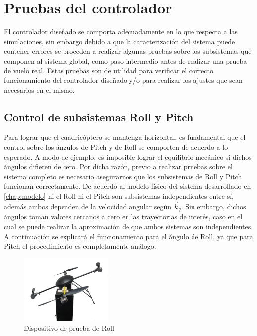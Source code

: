 \documentclass[main]{subfiles}
\begin{document}
\chapter{Pruebas del controlador}
El controlador diseñado se comporta adecuadamente en lo que respecta a las simulaciones, sin embargo debido a que la caracterizaci\'on del sistema puede contener errores se proceden a realizar algunas pruebas sobre los subsistemas que componen al sistema global, como paso intermedio antes de realizar una prueba de vuelo real. Estas pruebas son de utilidad para verificar el correcto funcionamiento del controlador diseñado y/o para realizar los ajustes que sean necesarios en el mismo.

\section{Control de subsistemas Roll y Pitch}

Para lograr que el cuadric\'optero se mantenga horizontal, es fundamental que el control sobre los \'angulos de Pitch y de Roll se comporten de acuerdo a lo esperado. A modo de ejemplo, es imposible lograr el equilibrio mec\'anico si dichos \'angulos difieren de cero. Por dicha raz\'on, previo a realizar pruebas sobre el sistema completo es necesario asegurarnos que los subsistemas de  Roll y Pitch funcionan correctamente. De acuerdo al modelo f\'isico del sistema desarrollado en \ref{chap:modelo} ni el Roll ni el Pitch son subsistemas independientes entre s\'i, adem\'as ambos dependen de la velocidad angular seg\'un $\vec{k}_q$. Sin embargo, dichos \'angulos toman valores cercanos a cero en las trayectorias de inter\'es, caso en el cual se puede realizar la aproximaci\'on de que ambos sistemas son independientes.\\
A continuación se explicará el funcionamiento para el ángulo de Roll, ya que para Pitch el procedimiento es completamente análogo.\\

\begin{figure}
	\vspace{-20pt}
	\centering
	\includegraphics[width=0.4\textwidth]{./pics_test_control/dispositivo_psi.pdf}
	\caption{Dispositivo de prueba de Roll}
	\label{fig:psidisp}
	\vspace{-10pt}
\end{figure}
\end{document}
